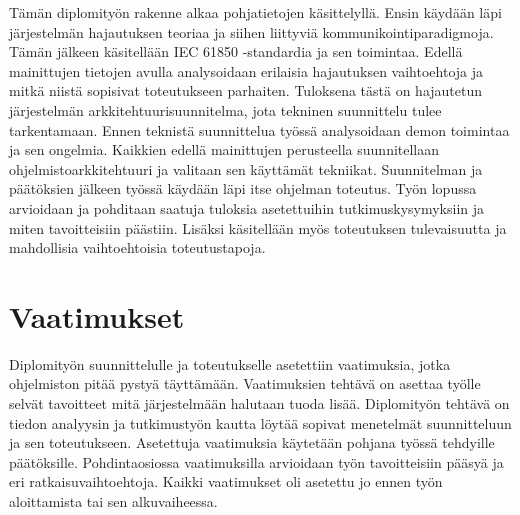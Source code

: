 Tämän diplomityön rakenne alkaa pohjatietojen käsittelyllä. Ensin käydään läpi järjestelmän hajautuksen teoriaa ja siihen liittyviä kommunikointiparadigmoja. Tämän jälkeen käsitellään IEC 61850 -standardia ja sen toimintaa. Edellä mainittujen tietojen avulla analysoidaan erilaisia hajautuksen vaihtoehtoja ja mitkä niistä sopisivat toteutukseen parhaiten. Tuloksena tästä on hajautetun järjestelmän arkkitehtuurisuunnitelma, jota tekninen suunnittelu tulee tarkentamaan. Ennen teknistä suunnittelua työssä analysoidaan demon toimintaa ja sen ongelmia. Kaikkien edellä mainittujen perusteella suunnitellaan ohjelmistoarkkitehtuuri ja valitaan sen käyttämät tekniikat. Suunnitelman ja päätöksien jälkeen työssä käydään läpi itse ohjelman toteutus. Työn lopussa arvioidaan ja pohditaan saatuja tuloksia asetettuihin tutkimuskysymyksiin ja miten tavoitteisiin päästiin. Lisäksi käsitellään myös toteutuksen tulevaisuutta ja mahdollisia vaihtoehtoisia toteutustapoja.


\section{Vaatimukset}
\label{ch:vaatimukset}
Diplomityön suunnittelulle ja toteutukselle asetettiin vaatimuksia, jotka ohjelmiston pitää pystyä täyttämään. Vaatimuksien tehtävä on asettaa työlle selvät tavoitteet mitä järjestelmään halutaan tuoda lisää. Diplomityön tehtävä on tiedon analyysin ja tutkimustyön kautta löytää sopivat menetelmät suunnitteluun ja sen toteutukseen. Asetettuja vaatimuksia käytetään pohjana työssä tehdyille päätöksille. Pohdintaosiossa vaatimuksilla arvioidaan työn tavoitteisiin pääsyä ja eri ratkaisuvaihtoehtoja. Kaikki vaatimukset oli asetettu jo ennen työn aloittamista tai sen alkuvaiheessa.

